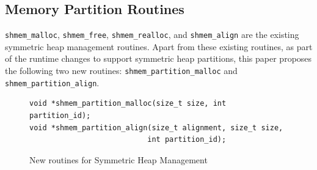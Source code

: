 



\subsection{Memory Partition Routines}
\label{src:smempart/routines}
\texttt{shmem\_malloc}, \texttt{shmem\_free}, \texttt{shmem\_realloc},
and \texttt{shmem\_align} are the existing symmetric heap management
routines. Apart from these existing routines, as part of the runtime
changes to support symmetric heap partitions, this paper proposes the
following two new routines: \texttt{shmem\_partition\_malloc} and
\texttt{shmem\_partition\_align}.

\begin{figure}
    \lstset{language=c,
            keywordstyle=\bfseries,
            basicstyle=\tt\small,
            frame=single}
    \vspace{-20pt}
    \begin{lstlisting}
void *shmem_partition_malloc(size_t size, int partition_id);
void *shmem_partition_align(size_t alignment, size_t size,
                           int partition_id);
    \end{lstlisting}
    \vspace{-10pt}
    \caption{New routines for Symmetric Heap Management}
    \vspace{-20pt}
    \label{fig:routines}
\end{figure}

